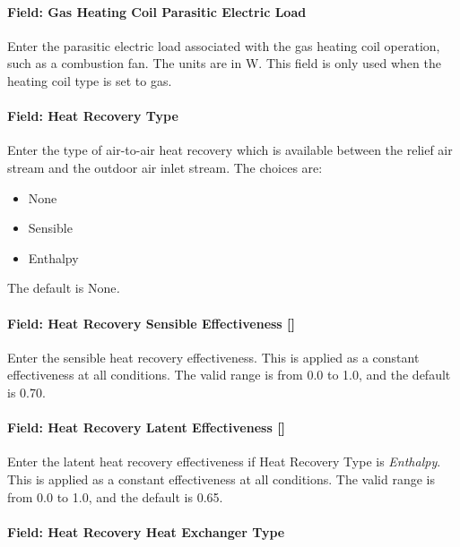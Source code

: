 \paragraph{Field: Gas Heating Coil Parasitic Electric Load}\label{field-gas-heating-coil-parasitic-electric-load-7}

Enter the parasitic electric load associated with the gas heating coil operation, such as a combustion fan. The units are in W. This field is only used when the heating coil type is set to gas.

\paragraph{Field: Heat Recovery Type}\label{field-heat-recovery-type-8}

Enter the type of air-to-air heat recovery which is available between the relief air stream and the outdoor air inlet stream. The choices are:

\begin{itemize}
\item
  None
\item
  Sensible
\item
  Enthalpy
\end{itemize}

The default is None\emph{.}

\paragraph{Field: Heat Recovery Sensible Effectiveness {[]}}\label{field-heat-recovery-sensible-effectiveness}

Enter the sensible heat recovery effectiveness. This is applied as a constant effectiveness at all conditions. The valid range is from 0.0 to 1.0, and the default is 0.70.

\paragraph{Field: Heat Recovery Latent Effectiveness {[]}}\label{field-heat-recovery-latent-effectiveness}

Enter the latent heat recovery effectiveness if Heat Recovery Type is \emph{Enthalpy}. This is applied as a constant effectiveness at all conditions. The valid range is from 0.0 to 1.0, and the default is 0.65.

\paragraph{Field: Heat Recovery Heat Exchanger Type}\label{field-heat-recovery-heat-exchanger-type-3}


